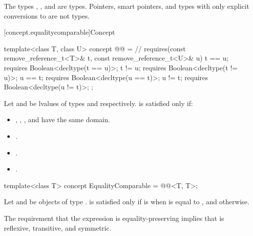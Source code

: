\pnum
\begin{example}
The types , , and
 are 
types. Pointers, smart pointers, and types with only explicit conversions to
 are not  types.
\end{example}

[concept.equalitycomparable]{Concept }

\begin{itemdecl}
template<class T, class U>
  concept @@ = // \expos
    requires(const remove_reference_t<T>& t,
             const remove_reference_t<U>& u) {
      t == u; requires Boolean<decltype(t == u)>;
      t != u; requires Boolean<decltype(t != u)>;
      u == t; requires Boolean<decltype(u == t)>;
      u != t; requires Boolean<decltype(u != t)>;
    };
\end{itemdecl}

\begin{itemdescr}
\pnum
Let  and  be lvalues of types
 and
 respectively.
is satisfied only if:
\begin{itemize}
\item {}, , , and 
      have the same domain.
\item {}.
\item {}.
\item {}.
\end{itemize}
\end{itemdescr}

%
\begin{itemdecl}
template<class T>
  concept EqualityComparable = @@<T, T>;
\end{itemdecl}

\begin{itemdescr}
\pnum
Let  and  be objects of type .
 is satisfied only if
 is  when  is equal to
, and  otherwise.

\pnum
\begin{note}
The requirement that the expression  is equality-preserving
implies that \tcode{==} is reflexive, transitive, and symmetric.
\end{note}
\end{itemdescr}

